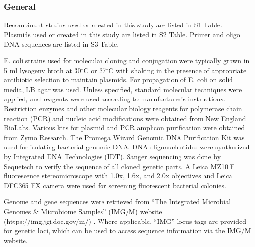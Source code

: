 {{{{{{{\subsubsection{General}
Recombinant strains used or created in this study are listed in S1 Table. Plasmids used or created in this study are listed in S2 Table. Primer and oligo DNA sequences are listed in S3 Table. 

E. coli strains used for molecular cloning and conjugation were typically grown in 5 ml lysogeny broth at 30$^\circ$C or 37$^\circ$C with shaking in the presence of appropriate antibiotic selection to maintain plasmids. For propagation of E. coli on solid media, LB agar was used. Unless specified, standard molecular techniques were applied, and reagents were used according to manufacturer's instructions. Restriction enzymes and other molecular biology reagents for polymerase chain reaction (PCR) and nucleic acid modifications were obtained from New England BioLabs. Various kits for plasmid and PCR amplicon purification were obtained from Zymo Research. The Promega Wizard Genomic DNA Purification Kit was used for isolating bacterial genomic DNA. DNA oligonucleotides were synthesized by Integrated DNA Technologies (IDT). Sanger sequencing was done by Sequetech to verify the sequence of all cloned genetic parts. A Leica MZ10 F fluorescence stereomicroscope with 1.0x, 1.6x, and 2.0x objectives and Leica DFC365 FX camera were used for screening fluorescent bacterial colonies. 

Genome and gene sequences were retrieved from ``The Integrated Microbial Genomes \& Microbiome Samples'' (IMG/M) website (https://img.jgi.doe.gov/m/) \cite{chen_imgm_2017}. Where applicable, ``IMG'' locus tags are provided for genetic loci, which can be used to access sequence information via the IMG/M website. 

}}}}}}}
